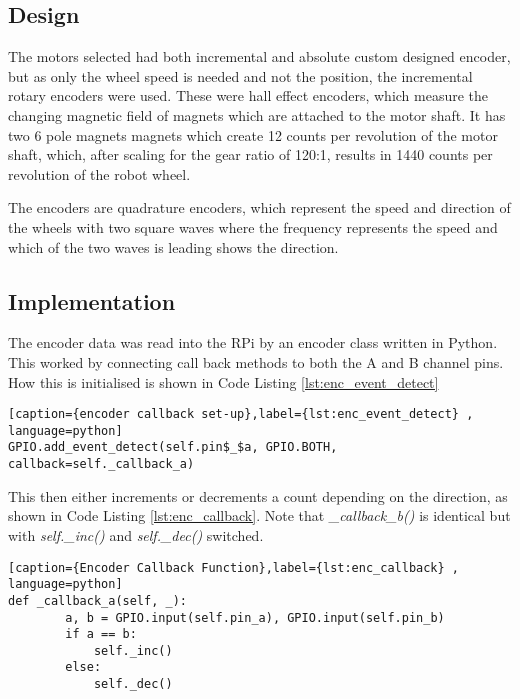 \subsection{Design}\label{elec/encoder/design}
 The motors selected had both incremental and absolute custom designed encoder, but as only the wheel speed is needed and not the position, the incremental rotary encoders were used. These were hall effect encoders, which measure the changing magnetic field of magnets which are attached to the motor shaft. It has two 6 pole magnets magnets which create 12 counts per revolution of the motor shaft, which, after scaling for the gear ratio of 120:1, results in 1440 counts per revolution of the robot wheel. 
 
The encoders are quadrature encoders, which represent the speed and direction of the wheels with two square waves where the frequency represents the speed and which of the two waves is leading shows the direction.

\subsection{Implementation}\label{elec/encoder/impl}

The encoder data was read into the RPi by an encoder class written in Python. This worked by connecting call back methods to both the A and B channel pins. How this is initialised is shown in Code Listing \ref{lst:enc_event_detect}


\begin{lstlisting}[caption={encoder callback set-up},label={lst:enc_event_detect} , language=python]
GPIO.add_event_detect(self.pin$_$a, GPIO.BOTH, callback=self._callback_a)
\end{lstlisting}

This then either increments or decrements a count depending on the direction, as shown in Code Listing \ref{lst:enc_callback}. Note that \textit{\_callback\_b()} is identical but with \textit{self.\_inc()} and \textit{self.\_dec()} switched.

\begin{lstlisting}[caption={Encoder Callback Function},label={lst:enc_callback} , language=python]
def _callback_a(self, _):
        a, b = GPIO.input(self.pin_a), GPIO.input(self.pin_b)
        if a == b:
            self._inc()
        else:
            self._dec()
\end{lstlisting}


